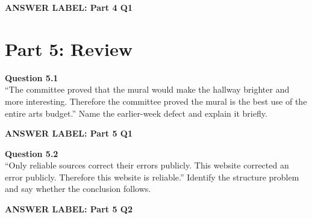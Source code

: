 \documentclass[12pt]{article}
\newcommand{\answerbox}[2]{%
\vspace{0.15em}
\noindent\textbf{#1}\par
\vspace{0.05em}
\noindent\fbox{%
\begin{minipage}[t][#2]{\dimexpr\textwidth-2\fboxsep-2\fboxrule}
\rule{\textwidth}{0pt}
\vspace{#2}
\end{minipage}
}\par
\vspace{0.25em}
}
\begin{document}
\answerbox{ANSWER LABEL: Part 4 Q1}{3.0in}

\newpage

\section*{Part 5: Review}

\textbf{Question 5.1}\\[-0.15em]
``The committee proved that the mural would make the hallway brighter and more interesting. Therefore the committee proved the mural is the best use of the entire arts budget.'' Name the earlier-week defect and explain it briefly.

\answerbox{ANSWER LABEL: Part 5 Q1}{2.0in}

\textbf{Question 5.2}\\[-0.15em]
``Only reliable sources correct their errors publicly. This website corrected an error publicly. Therefore this website is reliable.'' Identify the structure problem and say whether the conclusion follows.

\answerbox{ANSWER LABEL: Part 5 Q2}{2.0in}
\end{document}
